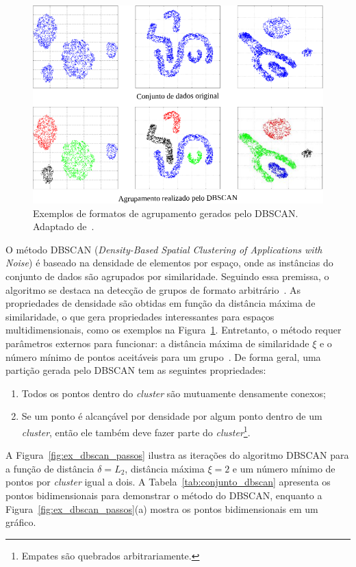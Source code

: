 \begin{figure}[!b]
\centering
\includegraphics[scale=1]{_fig/dbscan.pdf}
\caption[Exemplos de formatos de agrupamento gerados pelo DBSCAN]{Exemplos de formatos de agrupamento gerados pelo DBSCAN.
Adaptado de~.}
\label{fig:dbscan}
\end{figure}

O método DBSCAN (\textit{Density-Based Spatial Clustering of Applications with Noise}) é baseado na densidade de elementos por espaço, onde as instâncias do conjunto de dados são agrupados por similaridade.
Seguindo essa premissa, o algoritmo se destaca na detecção de grupos de formato arbitrário~\cite{Ester1996,Mumtaz2010}.
As propriedades de densidade são obtidas em função da distância máxima de similaridade, o que gera propriedades interessantes para espaços multidimensionais, como os exemplos na Figura~\ref{fig:dbscan}.
Entretanto, o método requer parâmetros externos para funcionar: a distância máxima de similaridade $\xi$ e o número mínimo de pontos aceitáveis para um grupo~\cite{Tan2007}.
De forma geral, uma partição gerada pelo DBSCAN tem as seguintes propriedades:

\begin{enumerate}
    \item Todos os pontos dentro do \textit{cluster} são mutuamente densamente conexos;
    \item Se um ponto é alcançável por densidade por algum ponto dentro de um \textit{cluster}, então ele também deve fazer parte do \textit{cluster}\footnote{Empates são quebrados arbitrariamente.}.
\end{enumerate}

A Figura~\ref{fig:ex_dbscan_passos} ilustra as iterações do algoritmo DBSCAN para a função de distância $\delta = L_2$, distância máxima $\xi = 2$ e um número mínimo de pontos por \textit{cluster} igual a dois.
A Tabela~\ref{tab:conjunto_dbscan} apresenta os pontos bidimensionais para demonstrar o método do DBSCAN, enquanto a Figura~\ref{fig:ex_dbscan_passos}(a) mostra os pontos bidimensionais em um gráfico.

